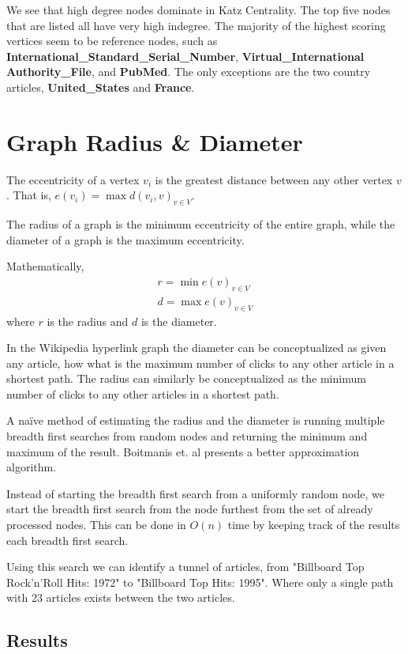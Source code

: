 \documentclass{article}
\begin{document}
We see that high degree nodes dominate in Katz Centrality.
The top five nodes that are listed all have very high indegree.
The majority of the highest scoring vertices seem to be reference nodes, such as \textbf{International\_Standard\_Serial\_Number}, \textbf{Virtual\_International Authority\_File}, and \textbf{PubMed}.
The only exceptions are the two country articles, \textbf{United\_States} and \textbf{France}.

\section{Graph Radius \& Diameter}

The eccentricity of a vertex $v_i$ is the greatest distance between any other vertex $v$. That is, $e(v_i) = \max d(v_i, v)_{v \in V}$.

The radius of a graph is the minimum eccentricity of the entire graph, while the diameter of a graph is the maximum eccentricity.


Mathematically,
\begin{align*}
    r = \min e(v)_{v \in V} \\
    d = \max e(v)_{v \in V}
\end{align*}
where $r$ is the radius and $d$ is the diameter.

In the Wikipedia hyperlink graph the diameter can be conceptualized as given any article, how what is the maximum number of clicks to any other article in a shortest path. The radius can similarly be conceptualized as the minimum number of clicks to any other articles in a shortest path.


A naïve method of estimating the radius and the diameter is running multiple breadth first searches from random nodes and returning the minimum and maximum of the result. Boitmanis et. al presents a better approximation algorithm.

Instead of starting the breadth first search from a uniformly random node, we start the breadth first search from the node furthest from the set of already processed nodes. This can be done in $O(n)$ time by keeping track of the results each breadth first search.

Using this search we can identify a tunnel of articles, from "Billboard Top Rock'n'Roll Hits: 1972" to "Billboard Top Hits: 1995". Where only a single path with 23 articles exists between the two articles.


\subsection*{Results}
\end{document}
